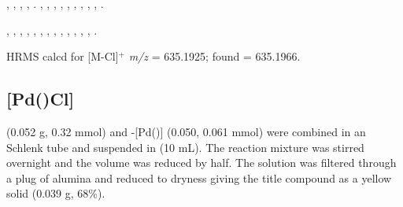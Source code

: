 
\begin{sloppypar}
,
,
,
,
.
,
,
,
,
,
,
,
,
,
.
\end{sloppypar}

\begin{sloppypar}
,
,
,
,
,
,
,
,
,
,
,
,
,
.
\end{sloppypar}

HRMS calcd for  [M-Cl]$^+$ \emph{m/z} = 635.1925; found = 635.1966.


\subsection*{[Pd(\tButhixantphosk)Cl]}


 (0.052 g, 0.32 mmol) and \trans-[Pd(\tButhixantphos)] (0.050, 0.061 mmol) were combined in an Schlenk tube and suspended in  (10 mL).  The reaction mixture was stirred overnight and the volume was reduced by half.  The solution was filtered through a plug of alumina and reduced to dryness giving the title compound as a yellow solid (0.039 g, 68\%).  

